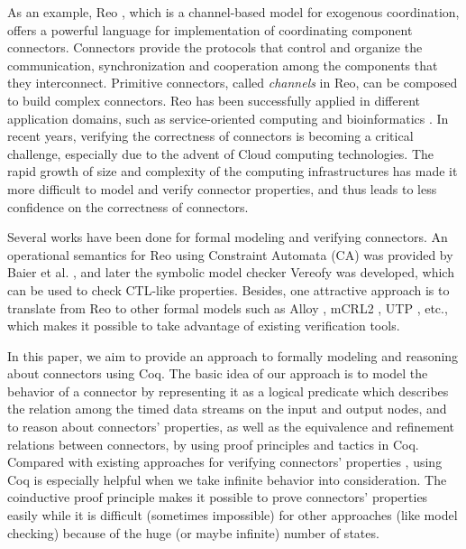 \documentclass{llncs}
\begin{document}
As an example, Reo \cite{Arb04}, which is a channel-based model for exogenous coordination, offers
a powerful language for implementation of coordinating component connectors. Connectors provide the protocols that control and organize
the communication, synchronization and cooperation among the components that they interconnect. Primitive connectors, called {\em channels}
in Reo, can be composed to build complex connectors. Reo has been successfully applied in different application domains, such as
service-oriented computing and bioinformatics \cite{CCA04,SA07}. In recent years,
verifying the correctness of connectors is becoming a critical challenge, especially due to the advent of Cloud computing
technologies. The rapid growth of size and complexity of the computing infrastructures has made it more difficult to model
and verify connector properties, and thus leads to less confidence on the correctness of connectors.


Several works have been done for formal modeling and verifying connectors. An operational semantics for Reo using Constraint Automata
(CA) was provided by Baier et al. \cite{BSAR06}, and later the symbolic model checker Vereofy \cite{BBK+10} was developed,
which can be used to check CTL-like properties.
Besides, one attractive approach is to translate from Reo to other formal models such as Alloy
\cite{KSA+08}, mCRL2 \cite{KKV12}, UTP \cite{AAA+09,SAA+12}, etc., which makes it possible to take
advantage of existing verification tools.

In this paper, we aim to provide an approach to formally modeling and reasoning about connectors using Coq.
The basic idea of our
approach is to model the behavior of a connector by representing it as a logical predicate which describes the relation among
the timed data streams on the input and output nodes, and to reason about connectors' properties, as
well as the equivalence and refinement relations
between connectors, by using proof principles and tactics in Coq.
Compared with existing approaches for verifying connectors' properties \cite{BBK+10,KB09,KKV12}, using Coq is especially helpful when
we take infinite behavior into consideration. The coinductive proof principle makes it possible to prove connectors' properties easily while it
is difficult (sometimes impossible) for other approaches (like model checking) because of the huge (or maybe infinite) number of states.
\end{document}
